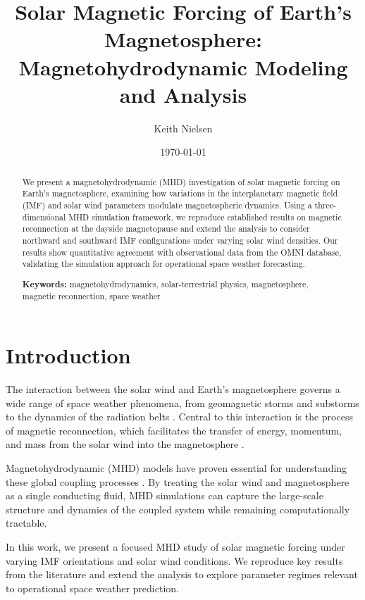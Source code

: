 \documentclass[twocolumn]{revtex4-2}
\title{Solar Magnetic Forcing of Earth's Magnetosphere:\\
       Magnetohydrodynamic Modeling and Analysis}
\author{Keith Nielsen}
\affiliation{Independent Researcher}
\date{\today}
\begin{document}
\maketitle

\begin{abstract}
We present a magnetohydrodynamic (MHD) investigation of solar magnetic
forcing on Earth's magnetosphere, examining how variations in the
interplanetary magnetic field (IMF) and solar wind parameters modulate
magnetospheric dynamics. Using a three-dimensional MHD simulation
framework, we reproduce established results on magnetic reconnection
at the dayside magnetopause and extend the analysis to consider
northward and southward IMF configurations under varying solar wind
densities. Our results show quantitative agreement with observational
data from the OMNI database, validating the simulation approach for
operational space weather forecasting.

\textbf{Keywords:} magnetohydrodynamics, solar-terrestrial physics,
magnetosphere, magnetic reconnection, space weather
\end{abstract}

\section{Introduction}
\label{sec:introduction}

The interaction between the solar wind and Earth's magnetosphere
governs a wide range of space weather phenomena, from geomagnetic
storms and substorms to the dynamics of the radiation belts
\cite{dungey1961,gonzalez1994}. Central to this interaction is the
process of magnetic reconnection, which facilitates the transfer of
energy, momentum, and mass from the solar wind into the
magnetosphere \cite{priest2000}.

Magnetohydrodynamic (MHD) models have proven essential for
understanding these global coupling processes
\cite{lyon2004,toth2005,gombosi2010}. By treating the solar wind and
magnetosphere as a single conducting fluid, MHD simulations can
capture the large-scale structure and dynamics of the coupled system
while remaining computationally tractable.

In this work, we present a focused MHD study of solar magnetic
forcing under varying IMF orientations and solar wind conditions. We
reproduce key results from the literature and extend the analysis to
explore parameter regimes relevant to operational space weather
prediction.
\end{document}
